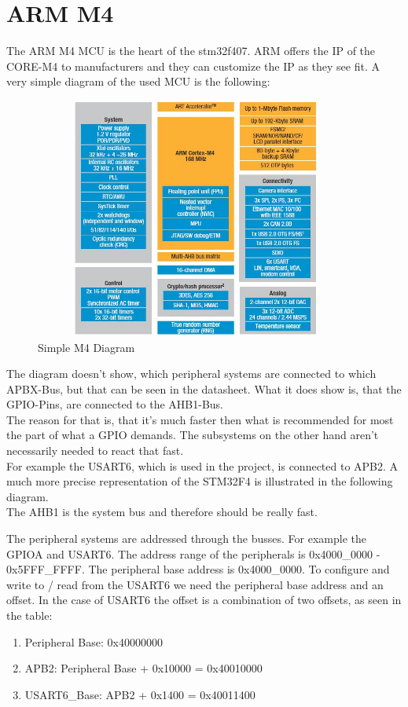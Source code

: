 \chapter{ARM M4}
The ARM M4 MCU is the heart of the stm32f407. ARM offers the IP of the
CORE-M4 to manufacturers and they can customize the IP as they see fit.
A very simple diagram of the used MCU is the following:\\

\begin{figure}[ht]
	\centering
	\includegraphics[width=400px,height=300px]{../img/stm32f4_prinzip.jpeg}
	\caption{Simple M4 Diagram}
	\label{m4_simple}
\end{figure}

The diagram doesn't show, which peripheral systems are connected to which
APBX-Bus, but that can be seen in the datasheet. What it does show is, that
the GPIO-Pins, are connected to the AHB1-Bus.\\
The reason for that is, that it's much faster then what is recommended
 for most the part of what a GPIO demands. The subsystems on the other hand aren't
 necessarily needed to react that fast.\\

For example the USART6, which is used in the project, is connected to APB2.
A much more precise representation of the STM32F4 is illustrated in the following diagram.\\

The AHB1 is the system bus and therefore should be really fast.


The peripheral systems are addressed through the busses. For example the
GPIOA and USART6.
The address range of the peripherals is 0x4000\_0000 - 0x5FFF\_FFFF. The
peripheral base address is 0x4000\_0000. To configure and write to / read from
the USART6 we need the peripheral base address and an offset. In the case of
USART6 the offset is a combination of two offsets, as seen in the table:

\begin{enumerate}
	\item Peripheral Base: 0x40000000
	\item APB2: Peripheral Base + 0x10000 = 0x40010000
	\item USART6\_Base: APB2 + 0x1400 = 0x40011400
\end{enumerate}

